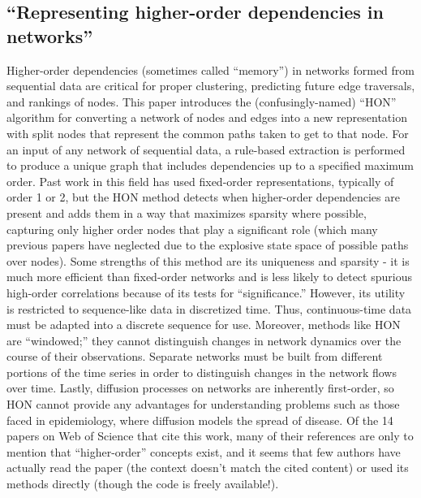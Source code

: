 \documentclass[sigconf]{acmart}
\begin{document}
\subsection{``Representing higher-order dependencies in networks'' \cite{Xu2016}} \label{paper:HON}
Higher-order dependencies (sometimes called ``memory'') in networks formed from sequential data are critical for proper clustering, predicting future edge traversals, and rankings of nodes.
This paper introduces the (confusingly-named) ``HON'' algorithm for converting a network of nodes and edges into a new representation with split nodes that represent the common paths taken to get to that node.
For an input of any network of sequential data, a rule-based extraction is performed to produce a unique graph that includes dependencies up to a specified maximum order.
Past work in this field has used fixed-order representations, typically of order 1 or 2, but the HON method detects when higher-order dependencies are present and adds them in a way that maximizes sparsity where possible, capturing only higher order nodes that play a significant role (which many previous papers have neglected due to the explosive state space of possible paths over nodes).
Some strengths of this method are its uniqueness and sparsity - it is much more efficient than fixed-order networks and is less likely to detect spurious high-order correlations because of its tests for ``significance.''
However, its utility is restricted to sequence-like data in discretized time.
Thus, continuous-time data must be adapted into a discrete sequence for use.
Moreover, methods like HON are ``windowed;'' they cannot distinguish changes in network dynamics over the course of their observations.
Separate networks must be built from different portions of the time series in order to distinguish changes in the network flows over time.
Lastly, diffusion processes on networks are inherently first-order, so HON cannot provide any advantages for understanding problems such as those faced in epidemiology, where diffusion models the spread of disease.
Of the 14 papers on Web of Science that cite this work, many of their references are only to mention that ``higher-order'' concepts exist, and it seems that few authors have actually read the paper (the context doesn't match the cited content) or used its methods directly (though the code is freely available!).
\end{document}
